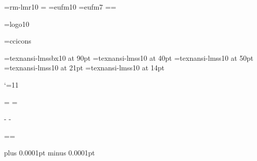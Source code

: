 






\newdimen\hpage \newdimen\vpage %

\def\[{\string\[} %
\files


\lmfonts\lmtitles\ansifont
 \font\tenrm=rm-lmr10 =\tenrm
\font\frakx=eufm10
\font\frakvii=eufm7
\newfam\frakfam \textfont\frakfam=\frakx \scriptfont\frakfam=\frakvii
\def\frak{\fam\frakfam\frakx}

\font\logo=logo10

\pdfcode
\pdfendcode
\font\ccicons=ccicons
\def\ccbysa{{\ccicons \char0\kern1pt\char1\kern1pt\char2}}

\font\ptitlefont=texnansi-lmssbx10 at 90pt
\font\psubtitlefont=texnansi-lmss10 at 40pt
\font\pauthorfont=texnansi-lmss10 at 50pt
\font\pcitafont=texnansi-lmss10 at 21pt
\font\ptextfont=texnansi-lmss10 at 14pt

\def\pdfBlack{\pdfliteral{0 0 0 1 k 0 0 0 1 K}}
\def\pdfWhite{\pdfliteral{0 0 0 0 k 0 0 0 0 K}}
\def\pdfRed{\pdfliteral{0 1 1 0 k 0 1 1 0 K}}
\def\pdfBlue{\pdfliteral{1 1 0 0 k 1 1 0 0 K}}
\def\pdfGreen{\pdfliteral{1 0 1 0 k 1 0 1 0 K}}

\catcode`\@=11


\let\docinfo\relax \let\infodoc\relax

\headline={\hfil}
\footline={\tenrm\ifodd\pageno \docinfo\hfil\folio
            \else \folio\hfil\infodoc \fi\strut}

\hpage=6in \hsize=10.5cm
 \hoffset\hpage \advance\hoffset-\hsize \divide{}
 \advance\hoffset-1in
\vpage=9in \baselineskip \advance\vsize\topskip %
 \voffset\vpage \advance\voffset-\vsize \advance{}\baselineskip
 \divide{} \advance\voffset-1in

\pdfcode \pdfpageheight=\vpage \pdfpagewidth=\hpage \pdfendcode

\parskip=0pt plus 0.0001pt minus 0.0001pt
\parindent=20pt 
\raggedbottom

\def\breakif#1{\vskip#1\baselineskip \penalty-250 \vskip-#1\baselineskip}

\]
